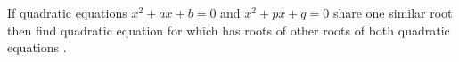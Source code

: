 If quadratic equations $x^2+ax+b=0$ and $x^2+px+q=0$ share one similar root then find quadratic equation for which has roots of other roots of both quadratic equations .
